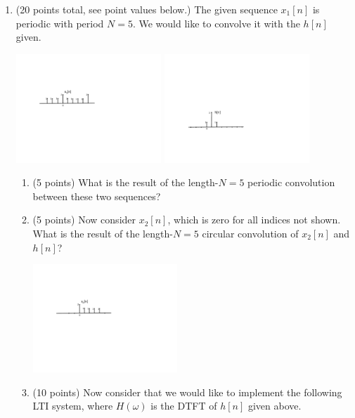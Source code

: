 \documentclass[]{siamltex}
\begin{document}
\begin{enumerate}
\newpage
\item (20 points total, see point values below.) The given sequence $x_1[n]$ is periodic with period $N=5$. We would like to convolve it with the $h[n]$ given. 
\vspace{4mm}

 \includegraphics[width=0.43\textwidth]{x1}  \includegraphics[width=0.43\textwidth]{h}


\begin{enumerate} 
\item (5 points) What is the result of the length-$N=5$ periodic convolution between these two sequences?

\vspace{3in}
\item (5 points) Now consider $x_2[n]$, which is zero for all indices not shown. What is the result of the length-$N=5$ circular convolution of $x_2[n]$ and $h[n]$?

\includegraphics[width=0.45\textwidth]{x2}

\newpage
\item (10 points) Now consider that we would like to implement the following LTI system, where $H(\omega)$ is the DTFT of $h[n]$ given above.


\end{enumerate}
\end{enumerate}
\end{document}
